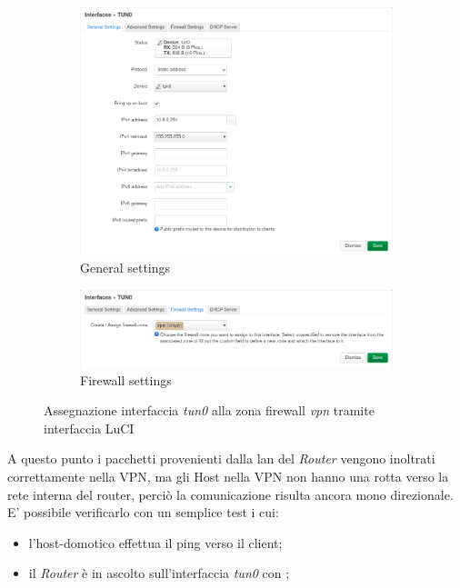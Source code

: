 \begin{figure}[H]
    \centering
    \begin{subfigure}{1\linewidth}
        \centering
        \includegraphics[width=1\linewidth]{immagini/LuCI_int_tun0_1}
        \caption{General settings}
        \label{fig:luci-firewall-interfaces}
    \end{subfigure}
    \medskip
    \begin{subfigure}{1\linewidth}
        \centering
        \includegraphics[width=1\linewidth]{immagini/LuCI_int_tun0_2}
        \caption{Firewall settings}
        \label{fig:luci-firewall-interfaces1}
    \end{subfigure}
    \caption{Assegnazione interfaccia \textit{tun0} alla zona firewall \textit{vpn} tramite interfaccia LuCI}
\end{figure}

A questo punto i pacchetti provenienti dalla lan del \textit{Router} vengono inoltrati correttamente nella VPN, ma gli Host nella VPN non hanno una rotta verso la rete interna del router, perciò la comunicazione risulta ancora mono direzionale. E' possibile verificarlo con un semplice test i cui:

\begin{itemize}[nosep]
    \item l'host-domotico effettua il ping verso il client;
    \item il \textit{Router} è in ascolto sull'interfaccia \textit{tun0} con ;
\end{itemize}

